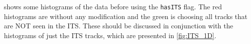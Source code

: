  shows some histograms of the data before using the \texttt{hasITS} flag. The red histograms are without any modification and the green is choosing all tracks that are NOT seen in the ITS. These should be discussed in conjunction with the histograms of just the ITS tracks, which are presented in \cref{fig:ITS_1D}.


